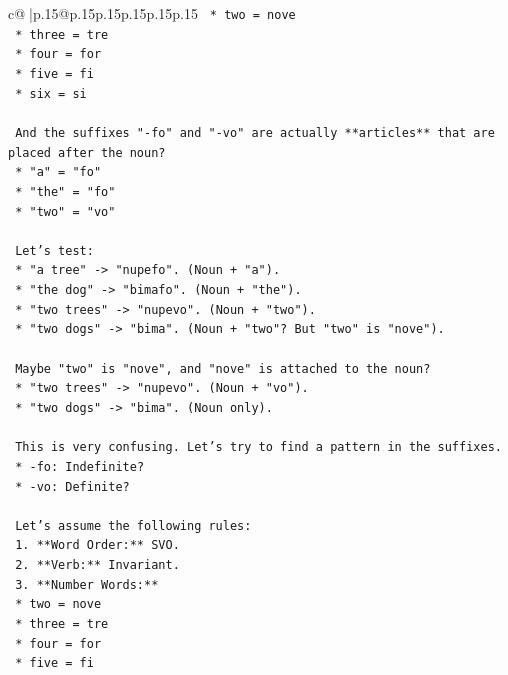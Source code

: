 \documentclass{article}
\begin{document}
{\begin{supertabular}{c@{$\;$}|p{.15\linewidth}@{}p{.15\linewidth}p{.15\linewidth}p{.15\linewidth}p{.15\linewidth}p{.15\linewidth}}
{{{\texttt{    *   two = nove} \\
\texttt{    *   three = tre} \\
\texttt{    *   four = for} \\
\texttt{    *   five = fi} \\
\texttt{    *   six = si} \\
\\ 
\texttt{    And the suffixes "{-}fo" and "{-}vo" are actually **articles** that are placed after the noun?} \\
\texttt{    *   "a" = "fo"} \\
\texttt{    *   "the" = "fo"} \\
\texttt{    *   "two" = "vo"} \\
\\ 
\texttt{    Let's test:} \\
\texttt{    *   "a tree" {-}> "nupefo". (Noun + "a").} \\
\texttt{    *   "the dog" {-}> "bimafo". (Noun + "the").} \\
\texttt{    *   "two trees" {-}> "nupevo". (Noun + "two").} \\
\texttt{    *   "two dogs" {-}> "bima". (Noun + "two"? But "two" is "nove").} \\
\\ 
\texttt{    Maybe "two" is "nove", and "nove" is attached to the noun?} \\
\texttt{    *   "two trees" {-}> "nupevo". (Noun + "vo").} \\
\texttt{    *   "two dogs" {-}> "bima". (Noun only).} \\
\\ 
\texttt{    This is very confusing. Let's try to find a pattern in the suffixes.} \\
\texttt{    *   {-}fo: Indefinite?} \\
\texttt{    *   {-}vo: Definite?} \\
\\ 
\texttt{    Let's assume the following rules:} \\
\texttt{    1.  **Word Order:** SVO.} \\
\texttt{    2.  **Verb:** Invariant.} \\
\texttt{    3.  **Number Words:**} \\
\texttt{        *   two = nove} \\
\texttt{        *   three = tre} \\
\texttt{        *   four = for} \\
\texttt{        *   five = fi} \\
}}}
\end{supertabular}}
\end{document}
